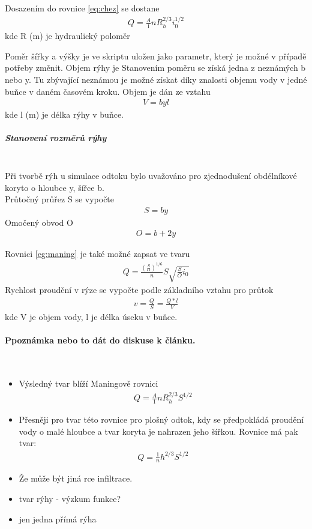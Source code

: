 \documentclass[a4paper, 12pt, twoside]{article}
\begin{document}
Dosazením do rovnice \ref{eq:chez} se dostane
\begin{eqnarray} \label{eg:maning}
Q =\frac A {1}{n} R_{h}^{2/3} i_{0}^{1/2}   
\end{eqnarray}
kde R (m) je hydraulický poloměr 

Poměr šířky a výšky je ve skriptu uložen jako parametr, který je možné v případě potřeby změnit. Objem rýhy je Stanovením poměru se získá jedna z neznámých b nebo y. Tu zbývající neznámou je možné získat díky znalosti objemu vody v jedné buňce v daném časovém kroku. Objem je dán ze vztahu
\begin{eqnarray}
V = byl 
\end{eqnarray} 
kde l (m) je délka rýhy v buňce. 

\subparagraph{Stanovení rozměrů rýhy}  \mbox{} \\
Při tvorbě rýh u simulace odtoku bylo uvažováno pro zjednodušení obdélníkové koryto o hloubce y, šířce b.\\

Průtočný průřez S se vypočte
\begin{eqnarray}
S = by
\end{eqnarray} 
Omočený obvod O
\begin{eqnarray}
O = b + 2y
\end{eqnarray} 

Rovnici \ref{eg:maning} je také možné zapsat ve tvaru 
\begin{eqnarray} \label{eq:total}
Q = \frac{\left(\frac{S}{O}\right)^{1/6}}{n} S \sqrt{\frac{S}{O} i_{0}}   
\end{eqnarray} 
Rychlost proudění v rýze se vypočte podle základního vztahu pro průtok
\begin{eqnarray} \label{eq:speed}
v = \frac{Q}{S} = \frac{Q * l}{V}   
\end{eqnarray}
kde V je objem vody, l je délka úseku v buňce.





\paragraph{Ppoznámka nebo to dát do diskuse k článku.}  \mbox{} \\
\begin{itemize}
\item Výsledný tvar blíží Maningově rovnici
\begin{eqnarray}
Q =\frac A {1}{n} R_{h}^{2/3} S^{1/2}
\end{eqnarray}
\item Přesněji pro tvar této rovnice pro plošný odtok, kdy se předpokládá proudění vody  o malé hloubce a tvar koryta je nahrazen jeho šířkou. Rovnice má pak tvar:
\begin{eqnarray}
Q =\frac {1}{n} h^{2/3} S^{1/2}
\end{eqnarray}
\item Že může být jiná rce infiltrace.
\item tvar rýhy - výzkum funkce?
\item jen jedna přímá rýha
\end{itemize}



%

\end{document}
